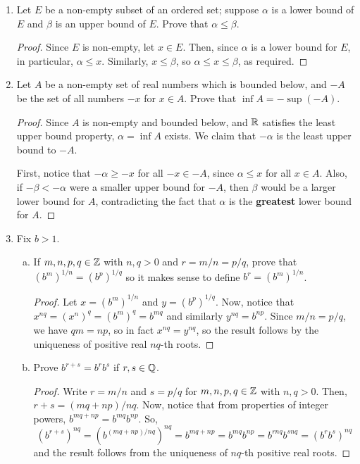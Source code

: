 \begin{enumerate}
\item Let $E$ be a non-empty subset of an ordered set; suppose $\alpha$ is a lower bound of $E$ and $\beta$ is an upper bound of $E$. Prove that $\alpha \le \beta$.

\begin{proof}
Since $E$ is non-empty, let $x \in E$. Then, since $\alpha$ is a lower bound for $E$, in particular, $\alpha \le x$. Similarly, $x \le \beta$, so $\alpha \le x \le \beta$, as required.
\end{proof}

\item Let $A$ be a non-empty set of real numbers which is bounded below, and $-A$ be the set of all numbers $-x$ for $x \in A$. Prove that $\inf A = -\sup(-A)$. 

\begin{proof}
Since $A$ is non-empty and bounded below, and $\mathbb{R}$ satisfies the least upper bound property, $\alpha = \inf A$ exists. We claim that $-\alpha$ is the least upper bound to $-A$.

First, notice that $-\alpha \ge -x$ for all $-x \in -A$, since $\alpha \le x$ for all $x \in A$. Also, if $-\beta < -\alpha$ were a smaller upper bound for $-A$, then $\beta$ would be a larger lower bound for $A$, contradicting the fact that $\alpha$ is the \textbf{greatest} lower bound for $A$.
\end{proof}

\item Fix $b > 1$.
\begin{enumerate}[(a)]
\item If $m, n, p, q \in \mathbb{Z}$ with $n, q > 0$ and $r = m/n = p/q$, prove that $(b^m)^{1/n} = (b^p)^{1/q}$ so it makes sense to define $b^r = (b^m)^{1/n}$.

\begin{proof}
Let $x = (b^m)^{1/n}$ and $y = (b^p)^{1/q}$. Now, notice that $x^{nq} = (x^n)^q = (b^m)^q = b^{mq}$ and similarly $y^{nq} = b^{np}$. Since $m/n = p/q$, we have $qm = np$, so in fact $x^{nq} = y^{nq}$, so the result follows by the uniqueness of positive real $nq$-th roots.
\end{proof}

\item Prove $b^{r+s} = b^r b^s$ if $r, s \in \mathbb{Q}$. 

\begin{proof}
Write $r = m/n$ and $s = p/q$ for $m, n, p, q \in \mathbb{Z}$ with $n, q > 0$. Then, $r + s = (mq + np) / nq$. Now, notice that from properties of integer powers, $b^{mq + np} = b^{mq} b^{np}$. So,
\[
	(b^{r+s})^{nq} = (b^{(mq + np) / nq})^{nq} = b^{mq + np} = b^{mq} b^{np} = b^{rnq} b^{snq} = (b^r b^s)^{nq}
\]
and the result follows from the uniqueness of $nq$-th positive real roots. 
\end{proof}


\end{enumerate}
\end{enumerate}
